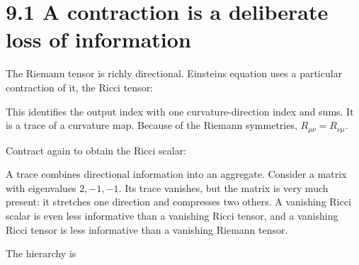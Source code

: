 \documentclass[
  11pt,
  letterpaper,
  oneside,
  openany]{scrbook}
\begin{document}
\hypertarget{a-contraction-is-a-deliberate-loss-of-information}{%
\section{9.1 A contraction is a deliberate loss of
information}\label{a-contraction-is-a-deliberate-loss-of-information}}

The Riemann tensor is richly directional. Einstein\textquotesingle s
equation uses a particular contraction of it, the Ricci tensor:

\begin{center}
\begingroup
{}
\ifdim\wd\grmathbox>\linewidth
\resizebox{\linewidth}{!}{\usebox{\grmathbox}}
\else\usebox{\grmathbox}\fi
\endgroup
\end{center}

This identifies the output index with one curvature-direction index and
sums. It is a trace of a curvature map. Because of the Riemann
symmetries, \(R_{\mu\nu}=R_{\nu\mu}\).

Contract again to obtain the Ricci scalar:

\begin{center}
\begingroup
{}
\ifdim\wd\grmathbox>\linewidth
\resizebox{\linewidth}{!}{\usebox{\grmathbox}}
\else\usebox{\grmathbox}\fi
\endgroup
\end{center}

A trace combines directional information into an aggregate. Consider a
matrix with eigenvalues \(2,-1,-1\). Its trace vanishes, but the matrix
is very much present: it stretches one direction and compresses two
others. A vanishing Ricci scalar is even less informative than a
vanishing Ricci tensor, and a vanishing Ricci tensor is less informative
than a vanishing Riemann tensor.

The hierarchy is

\begin{center}
\begingroup
{}
\ifdim\wd\grmathbox>\linewidth
\resizebox{\linewidth}{!}{\usebox{\grmathbox}}
\else\usebox{\grmathbox}\fi
\endgroup
\end{center}
\end{document}

